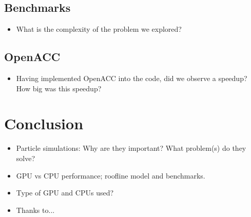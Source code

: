 \documentclass{usiinftr}
\begin{document}
\subsection{Benchmarks}
%
\begin{itemize}
	\item What is the complexity of the problem we explored?
\end{itemize}
%

\subsection{OpenACC}
%
\begin{itemize}
	\item Having implemented OpenACC into the code, did we observe a speedup? How big was this speedup?
\end{itemize}
%

\section{Conclusion} 
%
\begin{itemize}
	\item Particle simulations: Why are they important? What problem(s) do they solve?
	\item GPU vs CPU performance; roofline model and benchmarks.
	\item Type of GPU and CPUs used?
	\item Thanks to...
\end{itemize}
%



\end{document}
